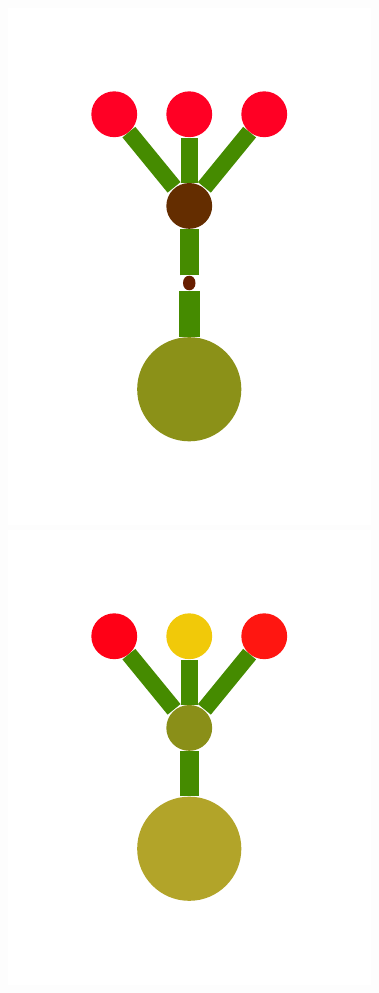 \documentclass[a4paper,10pt]{article}
\begin{document}
\begin{figure}[t]
  \includegraphics[scale=.26]{./figures/2-2-initProgram-2.pdf}
  \includegraphics[scale=.26]{./figures/2-2-initProgram-3.pdf}

\end{figure}
\end{document}
